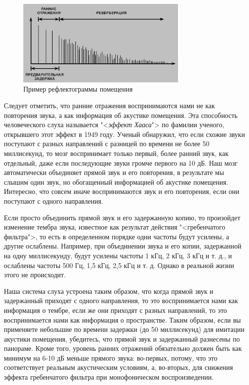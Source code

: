 \documentclass[oneside, final, 14pt]{extreport}
\begin{document}
\begin{figure}[h!]
  \centering
  \includegraphics[width=0.75\textwidth]{pic-rever-01}
  \caption{Пример рефлектограммы помещения }
  \label{pic-rever-01}
\end{figure}	

Следует отметить, что ранние отражения воспринимаются нами не как повторения звука, а как информация об акустике помещения. Эта способность человеческого слуха называется "<\emph{эффект Хааса}"> по фамилии ученого, открывшего этот эффект в 1949 году. Ученый обнаружил, что если схожие звуки поступают с разных направлений с разницей по времени не более 50 миллисекунд, то мозг воспринимает только первый, более ранний звук, как отдельный, даже если последующие звуки громче первого на 10 дБ. Наш мозг автоматически объединяет прямой звук и его повторения, в результате мы слышим один звук, но обогащенный информацией об акустике помещения. Интересно, что совсем иначе воспринимаются звук и его повторения, если они поступают с одного направления.

Если просто объединить прямой звук и его задержанную копию, то произойдет изменение тембра звука, известное как результат действия "<гребенчатого фильтра">, то есть в определенном порядке одни частоты будут усилены, а другие ослаблены. Например, при объединении звука и его копии, задержанной на одну миллисекунду, будут усилены частоты 1 кГц, 2 кГц, 3 кГц и т. д., и ослаблены частоты 500 Гц, 1,5 кГц, 2,5 кГц и т. д. Однако в реальной жизни этого не происходит.

Наша система слуха устроена таким образом, что когда прямой звук и задержанный приходят с одного направления, то это воспринимается нами как информация о тембре, если же они приходят с разных направлений, то это воспринимается нами как информация о пространстве. Таким образом, если вы применяете небольшие по времени задержки (до 50 миллисекунд) для имитации акустики помещения, убедитесь, что прямой звук и задержанный разнесены по панораме. Кроме того, уровень ранних отражений обязательно должен быть как минимум на 6-10 дБ меньше прямого звука: во-первых, потому, что это соответствует реальным акустическим условиям, а, во-вторых, для снижения эффекта гребенчатого фильтра при монофоническом воспроизведении.
\end{document}
